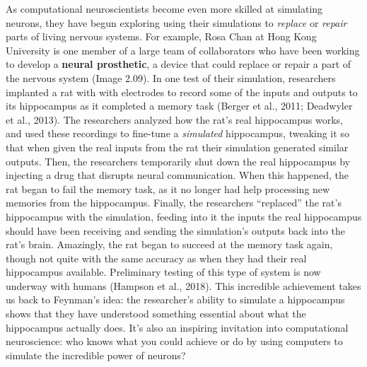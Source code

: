 \documentclass[
]{book}
\begin{document}
As computational neuroscientists become even more skilled at simulating neurons, they have begun exploring using their simulations to \emph{replace} or \emph{repair} parts of living nervous systems. For example, Rosa Chan at Hong Kong University is one member of a large team of collaborators who have been working to develop a \textbf{neural prosthetic}, a device that could replace or repair a part of the nervous system (Image 2.09). In one test of their simulation, researchers implanted a rat with with electrodes to record some of the inputs and outputs to its hippocampus as it completed a memory task (Berger et al., 2011; Deadwyler et al., 2013). The researchers analyzed how the rat's real hippocampus works, and used these recordings to fine-tune a \emph{simulated} hippocampus, tweaking it so that when given the real inputs from the rat their simulation generated similar outputs. Then, the researchers temporarily shut down the real hippocampus by injecting a drug that disrupts neural communication. When this happened, the rat began to fail the memory task, as it no longer had help processing new memories from the hippocampus. Finally, the researchers ``replaced'' the rat's hippocampus with the simulation, feeding into it the inputs the real hippocampus should have been receiving and sending the simulation's outputs back into the rat's brain. Amazingly, the rat began to succeed at the memory task again, though not quite with the same accuracy as when they had their real hippocampus available. Preliminary testing of this type of system is now underway with humans (Hampson et al., 2018). This incredible achievement takes us back to Feynman's idea: the researcher's ability to simulate a hippocampus shows that they have understood something essential about what the hippocampus actually does. It's also an inspiring invitation into computational neuroscience: who knows what you could achieve or do by using computers to simulate the incredible power of neurons?
\end{document}
